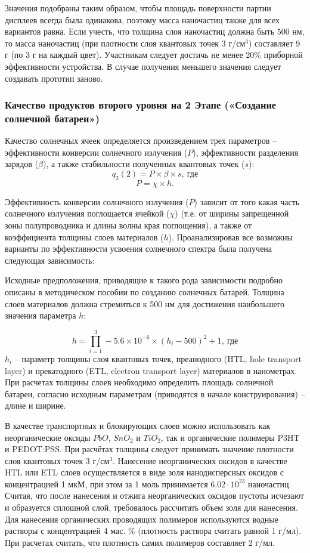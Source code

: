 Значения подобраны таким образом, чтобы площадь поверхности партии дисплеев всегда была одинакова, поэтому масса наночастиц также для всех вариантов равна. Если учесть, что толщина слоя наночастиц должна быть 500 нм, то масса наночастиц (при плотности слоя квантовых точек 3 г/см$^3$) составляет 9 г (по 3 г на каждый цвет).
Участникам следует достичь не менее 20\% приборной эффективности устройства. В случае получения меньшего значения следует создавать прототип заново.
\subsubsection*{Качество продуктов второго уровня на 2 Этапе («Создание солнечной батареи»)}
Качество солнечных ячеек определяется произведением трех параметров – эффективности конверсии солнечного излучения ($P$), эффективности разделения зарядов ($\beta$), а также стабильности полученных квантовых точек ($s$):
$$q_2 (2)=P \times  \beta \times s, \: \text{где}$$
$$P= \chi \times h.$$

Эффективность конверсии солнечного излучения ($P$) зависит от того какая часть солнечного излучения поглощается ячейкой ($\chi$) (т.е. от ширины запрещенной зоны полупроводника и длины волны края поглощения), а также от коэффициента толщины слоев материалов ($h$). Проанализировав все возможны варианты по эффективности усвоения солнечного спектра была получена следующая зависимость:

 
Исходные предположения, приводящие к такого рода зависимости подробно описаны в методическом пособии по созданию солнечных батарей. Толщина слоев материалов должна стремиться к 500 нм для достижения наибольшего значения параметра $h$:

$$h= \prod_{i=1}^3-5.6 \times 10^{-6}\times (h_i-500)^2+1, \: \text{где}$$
$h_i$ – параметр толщины слоя квантовых точек, преанодного (HTL, hole {transport} layer) и прекатодного (ETL, electron {transport} layer) материалов в нанометрах. При расчетах толщины слоев необходимо определить площадь солнечной батареи, согласно исходным параметрам (приводятся в начале конструирования) – длине и ширине.

В качестве транспортных и блокирующих слоев можно использовать как неорганические оксиды $PbO$, $SnO_2$ и $TiO_2$, так и органические полимеры P3HT и PEDOT:PSS. При расчётах толщины следует принимать значение плотности слоя квантовых точек 3 г/см$^3$. Нанесение неорганических оксидов в качестве HTL или ETL слоев осуществляется в виде золя нанодисперсных оксидов с концентрацией 1 мкМ, при этом за 1 моль принимается $6.02 \cdot 10^{23}$ наночастиц. Считая, что после нанесения и отжига неорганических оксидов пустоты исчезают и образуется сплошной слой, требовалось рассчитать объем золя для нанесения. Для нанесения органических проводящих полимеров используются водные растворы с концентрацией 4 мас. \% (плотность раствора считать равной 1 г/мл). При расчетах считать, что плотность самих полимеров составляет 2 г/мл.

